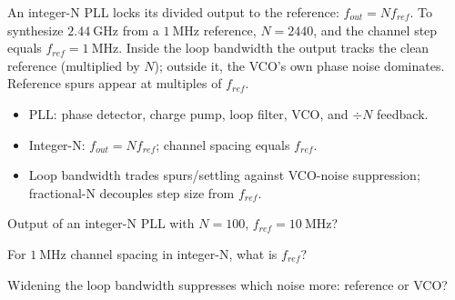 \begin{workedexample}
An integer-N PLL locks its divided output to the reference:
$f_{out} = N f_{ref}$. To synthesize $2.44\ \text{GHz}$ from a $1\ \text{MHz}$
reference, $N = 2440$, and the channel step equals $f_{ref} = 1\ \text{MHz}$.
Inside the loop bandwidth the output tracks the clean reference (multiplied by
$N$); outside it, the VCO's own phase noise dominates. Reference spurs appear at
multiples of $f_{ref}$.
\end{workedexample}

\begin{keytakeaways}
\begin{itemize}[leftmargin=1.4em,itemsep=2pt]
\item PLL: phase detector, charge pump, loop filter, VCO, and $\div N$ feedback.
\item Integer-N: $f_{out} = N f_{ref}$; channel spacing equals $f_{ref}$.
\item Loop bandwidth trades spurs/settling against VCO-noise suppression; fractional-N decouples step size from $f_{ref}$.
\end{itemize}
\end{keytakeaways}

\begin{exercises}
\item Output of an integer-N PLL with $N = 100$, $f_{ref} = 10\ \text{MHz}$?
\item For $1\ \text{MHz}$ channel spacing in integer-N, what is $f_{ref}$?
\item Widening the loop bandwidth suppresses which noise more: reference or VCO?
\end{exercises}

